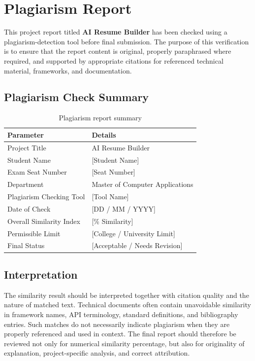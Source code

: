 \section*{Plagiarism Report}
\noindent This project report titled \textbf{AI Resume Builder} has been checked using a plagiarism-detection tool before final submission. The purpose of this verification is to ensure that the report content is original, properly paraphrased where required, and supported by appropriate citations for referenced technical material, frameworks, and documentation.

\subsection*{Plagiarism Check Summary}
\begin{table}[H]
\centering
\caption{Plagiarism report summary}
\begin{tabular}{|p{4.5cm}|p{7.0cm}|}
\hline
\textbf{Parameter} & \textbf{Details} \\
\hline
Project Title & AI Resume Builder \\
\hline
Student Name & [Student Name] \\
\hline
Exam Seat Number & [Seat Number] \\
\hline
Department & Master of Computer Applications \\
\hline
Plagiarism Checking Tool & [Tool Name] \\
\hline
Date of Check & [DD / MM / YYYY] \\
\hline
Overall Similarity Index & [\% Similarity] \\
\hline
Permissible Limit & [College / University Limit] \\
\hline
Final Status & [Acceptable / Needs Revision] \\
\hline
\end{tabular}
\end{table}

\subsection*{Interpretation}
\noindent The similarity result should be interpreted together with citation quality and the nature of matched text. Technical documents often contain unavoidable similarity in framework names, API terminology, standard definitions, and bibliography entries. Such matches do not necessarily indicate plagiarism when they are properly referenced and used in context. The final report should therefore be reviewed not only for numerical similarity percentage, but also for originality of explanation, project-specific analysis, and correct attribution.

